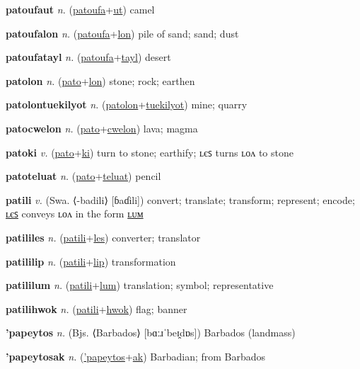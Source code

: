 \textbf{\hypertarget{patoufaut}{patoufaut}} \textit{n.} (\hyperlink{patoufa}{patoufa}+\allowbreak \hyperlink{ut}{ut})
camel

\textbf{\hypertarget{patoufalon}{patoufalon}} \textit{n.} (\hyperlink{patoufa}{patoufa}+\allowbreak \hyperlink{lon}{lon})
pile of sand; sand; dust

\textbf{\hypertarget{patoufatayl}{patoufatayl}} \textit{n.} (\hyperlink{patoufa}{patoufa}+\allowbreak \hyperlink{tayl}{tayl})
desert

\textbf{\hypertarget{patolon}{patolon}} \textit{n.} (\hyperlink{pato}{pato}+\allowbreak \hyperlink{lon}{lon})
stone; rock; earthen

\textbf{\hypertarget{patolontuekilyot}{patolontuekilyot}} \textit{n.} (\hyperlink{patolon}{patolon}+\allowbreak \hyperlink{tuekilyot}{tuekilyot})
mine; quarry

\textbf{\hypertarget{patocwelon}{patocwelon}} \textit{n.} (\hyperlink{pato}{pato}+\allowbreak \hyperlink{cwelon}{cwelon})
lava; magma

\textbf{\hypertarget{patoki}{patoki}} \textit{v.} (\hyperlink{pato}{pato}+\allowbreak \hyperlink{ki}{ki})
turn to stone; earthify; ʟєꜱ turns ʟᴏᴧ to stone

\textbf{\hypertarget{patoteluat}{patoteluat}} \textit{n.} (\hyperlink{pato}{pato}+\allowbreak \hyperlink{teluat}{teluat})
pencil

\textbf{\hypertarget{patili}{patili}} \textit{v.} (Swa. ⟨-badili⟩ [ɓaɗili])
convert; translate; transform; represent; encode; \hyperlink{patililes}{ʟєꜱ} conveys ʟᴏᴧ in the form \hyperlink{patililum}{ʟᴜᴍ}

\textbf{\hypertarget{patililes}{patililes}} \textit{n.} (\hyperlink{patili}{patili}+\allowbreak \hyperlink{les}{les})
converter; translator

\textbf{\hypertarget{patililip}{patililip}} \textit{n.} (\hyperlink{patili}{patili}+\allowbreak \hyperlink{lip}{lip})
transformation

\textbf{\hypertarget{patililum}{patililum}} \textit{n.} (\hyperlink{patili}{patili}+\allowbreak \hyperlink{lum}{lum})
translation; symbol; representative

\textbf{\hypertarget{patilihwok}{patilihwok}} \textit{n.} (\hyperlink{patili}{patili}+\allowbreak \hyperlink{hwok}{hwok})
flag; banner

\textbf{\hypertarget{'papeytos}{'papeytos}} \textit{n.} (Bjs. ⟨Barbados⟩ [bɑːɹˈbeɪ̯dɒs])
Barbados (landmass)

\textbf{\hypertarget{'papeytosak}{'papeytosak}} \textit{n.} (\hyperlink{'papeytos}{'papeytos}+\allowbreak \hyperlink{ak}{ak})
Barbadian; from Barbados

